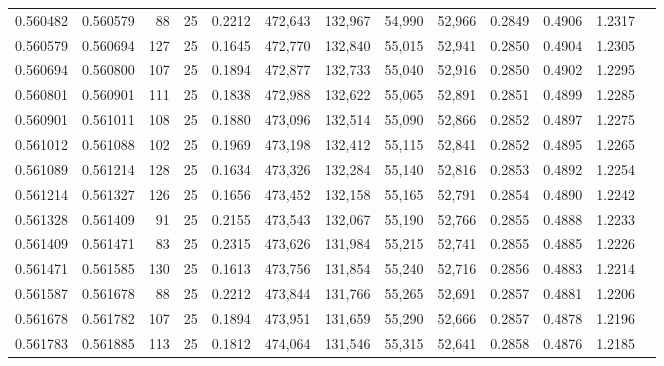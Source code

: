 \begin{tabular}{rrrrrrrrrrrrr}
0.560482 & 0.560579 &    88 &  25 &                                     0.2212 & 472,643 & 132,967 &  54,990 &  52,966 & 0.2849 & 0.4906 & 1.2317 \\
0.560579 & 0.560694 &   127 &  25 &                                     0.1645 & 472,770 & 132,840 &  55,015 &  52,941 & 0.2850 & 0.4904 & 1.2305 \\
0.560694 & 0.560800 &   107 &  25 &                                     0.1894 & 472,877 & 132,733 &  55,040 &  52,916 & 0.2850 & 0.4902 & 1.2295 \\
0.560801 & 0.560901 &   111 &  25 &                                     0.1838 & 472,988 & 132,622 &  55,065 &  52,891 & 0.2851 & 0.4899 & 1.2285 \\
0.560901 & 0.561011 &   108 &  25 &                                     0.1880 & 473,096 & 132,514 &  55,090 &  52,866 & 0.2852 & 0.4897 & 1.2275 \\
0.561012 & 0.561088 &   102 &  25 &                                     0.1969 & 473,198 & 132,412 &  55,115 &  52,841 & 0.2852 & 0.4895 & 1.2265 \\
0.561089 & 0.561214 &   128 &  25 &                                     0.1634 & 473,326 & 132,284 &  55,140 &  52,816 & 0.2853 & 0.4892 & 1.2254 \\
0.561214 & 0.561327 &   126 &  25 &                                     0.1656 & 473,452 & 132,158 &  55,165 &  52,791 & 0.2854 & 0.4890 & 1.2242 \\
0.561328 & 0.561409 &    91 &  25 &                                     0.2155 & 473,543 & 132,067 &  55,190 &  52,766 & 0.2855 & 0.4888 & 1.2233 \\
0.561409 & 0.561471 &    83 &  25 &                                     0.2315 & 473,626 & 131,984 &  55,215 &  52,741 & 0.2855 & 0.4885 & 1.2226 \\
0.561471 & 0.561585 &   130 &  25 &                                     0.1613 & 473,756 & 131,854 &  55,240 &  52,716 & 0.2856 & 0.4883 & 1.2214 \\
0.561587 & 0.561678 &    88 &  25 &                                     0.2212 & 473,844 & 131,766 &  55,265 &  52,691 & 0.2857 & 0.4881 & 1.2206 \\
0.561678 & 0.561782 &   107 &  25 &                                     0.1894 & 473,951 & 131,659 &  55,290 &  52,666 & 0.2857 & 0.4878 & 1.2196 \\
0.561783 & 0.561885 &   113 &  25 &                                     0.1812 & 474,064 & 131,546 &  55,315 &  52,641 & 0.2858 & 0.4876 & 1.2185 \\

\end{tabular}
